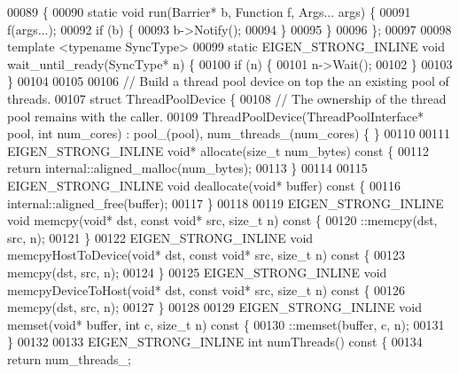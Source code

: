 \begin{DoxyCode}
00089 \{
00090   \textcolor{keyword}{static} \textcolor{keywordtype}{void} run(Barrier* b, Function f, Args... args) \{
00091     f(args...);
00092     \textcolor{keywordflow}{if} (b) \{
00093       b->Notify();
00094     \}
00095   \}
00096 \};
00097 
00098 \textcolor{keyword}{template} <\textcolor{keyword}{typename} SyncType>
00099 \textcolor{keyword}{static} EIGEN\_STRONG\_INLINE \textcolor{keywordtype}{void} wait\_until\_ready(SyncType* n) \{
00100   \textcolor{keywordflow}{if} (n) \{
00101     n->Wait();
00102   \}
00103 \}
00104 
00105 
00106 \textcolor{comment}{// Build a thread pool device on top the an existing pool of threads.}
00107 \textcolor{keyword}{struct }ThreadPoolDevice \{
00108   \textcolor{comment}{// The ownership of the thread pool remains with the caller.}
00109   ThreadPoolDevice(ThreadPoolInterface* pool, \textcolor{keywordtype}{int} num\_cores) : pool\_(pool), num\_threads\_(num\_cores) \{ \}
00110 
00111   EIGEN\_STRONG\_INLINE \textcolor{keywordtype}{void}* allocate(\textcolor{keywordtype}{size\_t} num\_bytes)\textcolor{keyword}{ const }\{
00112     \textcolor{keywordflow}{return} internal::aligned\_malloc(num\_bytes);
00113   \}
00114 
00115   EIGEN\_STRONG\_INLINE \textcolor{keywordtype}{void} deallocate(\textcolor{keywordtype}{void}* buffer)\textcolor{keyword}{ const }\{
00116     internal::aligned\_free(buffer);
00117   \}
00118 
00119   EIGEN\_STRONG\_INLINE \textcolor{keywordtype}{void} memcpy(\textcolor{keywordtype}{void}* dst, \textcolor{keyword}{const} \textcolor{keywordtype}{void}* src, \textcolor{keywordtype}{size\_t} n)\textcolor{keyword}{ const }\{
00120     ::memcpy(dst, src, n);
00121   \}
00122   EIGEN\_STRONG\_INLINE \textcolor{keywordtype}{void} memcpyHostToDevice(\textcolor{keywordtype}{void}* dst, \textcolor{keyword}{const} \textcolor{keywordtype}{void}* src, \textcolor{keywordtype}{size\_t} n)\textcolor{keyword}{ const }\{
00123     memcpy(dst, src, n);
00124   \}
00125   EIGEN\_STRONG\_INLINE \textcolor{keywordtype}{void} memcpyDeviceToHost(\textcolor{keywordtype}{void}* dst, \textcolor{keyword}{const} \textcolor{keywordtype}{void}* src, \textcolor{keywordtype}{size\_t} n)\textcolor{keyword}{ const }\{
00126     memcpy(dst, src, n);
00127   \}
00128 
00129   EIGEN\_STRONG\_INLINE \textcolor{keywordtype}{void} memset(\textcolor{keywordtype}{void}* buffer, \textcolor{keywordtype}{int} c, \textcolor{keywordtype}{size\_t} n)\textcolor{keyword}{ const }\{
00130     ::memset(buffer, c, n);
00131   \}
00132 
00133   EIGEN\_STRONG\_INLINE \textcolor{keywordtype}{int} numThreads()\textcolor{keyword}{ const }\{
00134     \textcolor{keywordflow}{return} num\_threads\_;

\end{DoxyCode}
